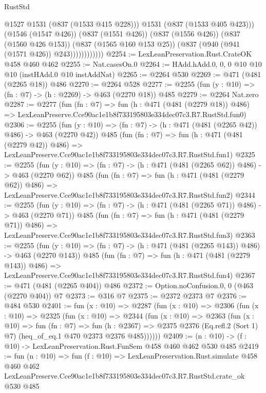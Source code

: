 \begin{lexlean}{RustStd}
\begin{coremodule}
                            @1527
                            @1531
                            (@837 (@1533 @415 @228)))
                          @1531
                          (@837 (@1533 @405 @423)))
                        (@1546 (@1547 @426))
                        (@837 (@1551 @426))
                        (@837 (@1556 @426))
                        (@837 (@1560 @426 @153))
                        (@837 (@1565 @160 @153 @25))
                        (@837 (@940 (@941 (@1571 @426)) @243))))))))))))
@2254 := LexLeanPreservation.Rust.CrateOK @458 @460 @462
@2255 := Nat.casesOn.{0}
@2264 := HAdd.hAdd.{0, 0, 0} @10 @10 @10 (instHAdd.{0} @10 instAddNat)
@2265 := @2264 @530
@2269 := @471 (@481 (@2265 @18)) @486
@2270 := @2264 @528
@2277 := @2255 (fun (y : @10) => (fn : @7) -> (h : @2269) -> @463 (@2270 @18)) @485
@2279 := @2264 Nat.zero
@2287 := @2277
    (fun (fn : @7) =>
    fun (h : @471 (@481 (@2279 @18)) @486) =>
    LexLeanPreserve.Cce90ac1e1b8f733195803e334dec07c3.R7.RustStd.fun0)
@2306 := @2255
    (fun (y : @10) => (fn : @7) -> (h : @471 (@481 (@2265 @42)) @486) -> @463 (@2270 @42))
    @485
    (fun (fn : @7) =>
    fun (h : @471 (@481 (@2279 @42)) @486) =>
    LexLeanPreserve.Cce90ac1e1b8f733195803e334dec07c3.R7.RustStd.fun1)
@2325 := @2255
    (fun (y : @10) => (fn : @7) -> (h : @471 (@481 (@2265 @62)) @486) -> @463 (@2270 @62))
    @485
    (fun (fn : @7) =>
    fun (h : @471 (@481 (@2279 @62)) @486) =>
    LexLeanPreserve.Cce90ac1e1b8f733195803e334dec07c3.R7.RustStd.fun2)
@2344 := @2255
    (fun (y : @10) => (fn : @7) -> (h : @471 (@481 (@2265 @71)) @486) -> @463 (@2270 @71))
    @485
    (fun (fn : @7) =>
    fun (h : @471 (@481 (@2279 @71)) @486) =>
    LexLeanPreserve.Cce90ac1e1b8f733195803e334dec07c3.R7.RustStd.fun3)
@2363 := @2255
    (fun (y : @10) => (fn : @7) -> (h : @471 (@481 (@2265 @143)) @486) -> @463 (@2270 @143))
    @485
    (fun (fn : @7) =>
    fun (h : @471 (@481 (@2279 @143)) @486) =>
    LexLeanPreserve.Cce90ac1e1b8f733195803e334dec07c3.R7.RustStd.fun4)
@2367 := @471 (@481 (@2265 @404)) @486
@2372 := Option.noConfusion.{0, 0} (@463 (@2270 @404)) @7
@2373 := @316 @7
@2375 := @2372 @2373 @7
@2376 := @484 @530
@2401 := fun (x : @10) =>
  @2287
    (fun (x : @10) =>
    @2306
      (fun (x : @10) =>
      @2325
        (fun (x : @10) =>
        @2344
          (fun (x : @10) =>
          @2363
            (fun (x : @10) =>
            fun (fn : @7) =>
            fun (h : @2367) =>
            @2375 @2376 (Eq.refl.{2} (Sort 1) @7) (heq_of_eq.{1} @470 @2373 @2376 @485))))))
@2409 := (n : @10) -> (f : @10) -> LexLeanPreservation.Rust.FunSem @458 @460 @462 @530 @485
@2419 := fun (n : @10) =>
  fun (f : @10) =>
  LexLeanPreservation.Rust.simulate
    @458
    @460
    @462
    LexLeanPreserve.Cce90ac1e1b8f733195803e334dec07c3.R7.RustStd.crate_ok
    @530
    @485
\end{coremodule}
\end{lexlean}
